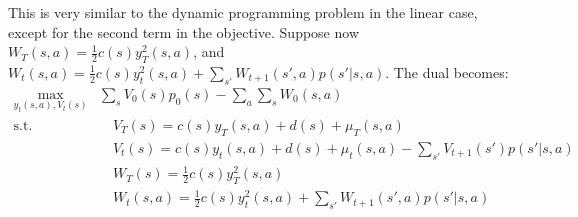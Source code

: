 \documentclass{jhwhw}
\newcommand{\half}{\frac{1}{2}}
\begin{document}
This is very similar to the dynamic programming problem in the linear case, except for the second term in the objective. Suppose now $W_T(s,a) = \half c(s) y_T^2(s,a) $, and $W_{t}(s,a)  = \half c(s) y_t^2(s,a) + \sum_{s'} W_{t+1}(s',a) p(s'|s,a) $. The dual becomes: 
\begin{equation}
\begin{aligned}
\max_{y_t(s,a), V_t(s)} & \sum_s V_0(s)p_0(s) - \sum_a\sum_s W_0(s,a)\\
\text{s.t.} & \quad V_T(s) = c(s)y_T(s,a) + d(s) + \mu_T(s,a) \\
& \quad V_t(s) = c(s)y_t(s,a) + d(s) + \mu_t(s,a)  - \sum_{s'}V_{t+1}(s') p(s'|s,a)\\
& \quad W_T(s) = \half c(s) y_T^2(s,a) \\
& \quad W_{t}(s,a)  = \half c(s) y_t^2(s,a) + \sum_{s'} W_{t+1}(s',a) p(s'|s,a) 
\end{aligned}
\end{equation}
\end{document}
